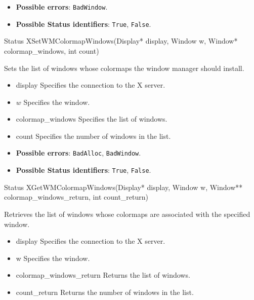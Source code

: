 \documentclass{report}
\begin{document}
\begin{itemize}
            \begin{itemize}
                \item \textbf{Possible errors}: \texttt{BadWindow}.
                \item \textbf{Possible Status identifiers}: \texttt{True}, \texttt{False}.
            \end{itemize}

            \begin{cppcode}
                Status XSetWMColormapWindows(Display* display, Window w, Window* colormap_windows, int count)
            \end{cppcode}
            \bigbreak \noindent
            Sets the list of windows whose colormaps the window manager should install.

            \begin{itemize}
                \item display Specifies the connection to the X server.
                \item $w$ Specifies the window.
                \item colormap\_windows Specifies the list of windows.
                \item count Specifies the number of windows in the list.
            \end{itemize}

            \begin{itemize}
                \item \textbf{Possible errors}: \texttt{BadAlloc}, \texttt{BadWindow}.
                \item \textbf{Possible Status identifiers}: \texttt{True}, \texttt{False}.
            \end{itemize}

            \begin{cppcode}
            Status XGetWMColormapWindows(Display* display, Window w, Window** colormap_windows_return, int count_return)
            \end{cppcode}
            \bigbreak \noindent
            Retrieves the list of windows whose colormaps are associated with the specified window.

            \begin{itemize}
                \item display Specifies the connection to the X server.
                \item w Specifies the window.
                \item colormap\_windows\_return Returns the list of windows.
                \item count\_return Returns the number of windows in the list.
            \end{itemize}


\end{itemize}
\end{document}
